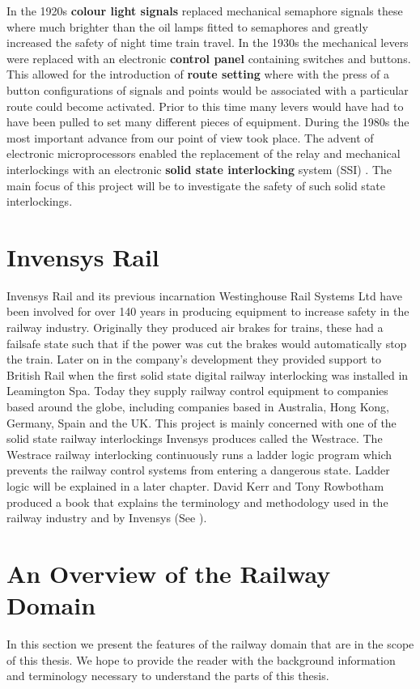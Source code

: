 In the 1920s \textbf{colour light signals} replaced mechanical semaphore signals these where much brighter than the oil
lamps fitted to semaphores and greatly increased the safety of night time
train travel. In the 1930s the mechanical levers were replaced with an electronic \textbf{control panel}
containing switches and buttons. This allowed for the introduction of
\textbf{route setting} where with the press of a button configurations of signals and points would be
associated with a particular route could become activated. Prior to this time
many levers would have had to have been pulled to set many different pieces of equipment.
During the 1980s the most important advance from our point of view took
place. The advent of electronic microprocessors enabled the replacement of the
relay and mechanical interlockings with an electronic \textbf{solid state interlocking}
system (SSI) \cite{AC08}. The main focus of this project will be to investigate the safety
of such solid state interlockings.

\section{Invensys Rail}

Invensys Rail \cite{Inven} and its previous incarnation Westinghouse Rail Systems Ltd have been
involved for over 140 years in producing equipment to increase safety in the
railway industry. Originally they produced air brakes for trains, these had a
failsafe state such that if the power was cut the brakes would automatically stop the train.
Later on in the company's development they provided support to British Rail
when the first solid state digital railway interlocking was installed in
Leamington Spa. Today they supply railway control equipment to companies based
around the globe, including companies based in Australia, Hong Kong,
Germany, Spain and the UK. This project is mainly concerned with one of the
solid state railway interlockings Invensys produces called the Westrace. The
Westrace railway interlocking continuously runs a ladder logic program which
prevents the railway control systems from entering a dangerous state. Ladder
logic will be explained in a later chapter.
David Kerr and Tony Rowbotham  produced a book that explains the
terminology and methodology used in the railway industry and by
Invensys (See \cite{KR01}).  

\section{An Overview of the Railway Domain} 
In this section we present the features of the railway domain that are in
the scope of this thesis. We hope to provide the reader with the background
information and terminology necessary to understand the parts of this thesis.


